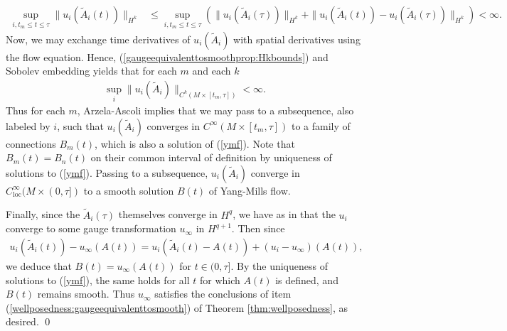 \documentclass[12pt]{amsart}
\renewcommand{\1}{{\mathbf 1}}
\theoremstyle{others}
\numberwithin{equation}{section}
\begin{document}
    \begin{align}\label{gaugeequivalenttosmoothprop:Hkbounds}
        \sup_{i, t_m \leq t \leq \tau} \|u_i(\tilde{A}_i(t))\|_{H^k} &\leq \sup_{i, t_m \leq t \leq \tau} \left(\|u_i(\tilde{A}_i(\tau))\|_{H^k} + \|u_i(\tilde{A}_i(t)) - u_i(\tilde{A}_i(\tau))\|_{H^k} \right) < \infty.
    \end{align} Now, we may exchange time derivatives of \(u_i(\tilde{A}_i)\) with spatial derivatives using the flow equation. Hence, (\ref{gaugeequivalenttosmoothprop:Hkbounds}) and Sobolev embedding yields that for each \(m\) and each \(k\)
    \begin{align*}
        \sup_i \|u_i(\tilde{A}_i)\|_{C^k(M \times [t_m, \tau])} < \infty.
    \end{align*}
    Thus for each \(m\), Arzela-Ascoli implies that we may pass to a subsequence, also labeled by \(i\), such that \(u_i(\tilde{A}_i)\) converges in \(C^\infty(M \times [t_m, \tau])\) to a family of connections \(B_m(t)\), which is also a solution of (\ref{ymf}). Note that \(B_m(t) = B_n(t)\) on their common interval of definition by uniqueness of solutions to (\ref{ymf}). Passing to a subsequence, \(u_i(\tilde{A}_i)\) converge in \(C_{\text{loc}}^\infty(M \times (0, \tau])\) to a smooth solution \(B(t)\) of Yang-Mills flow. \par
    Finally, since the \(\tilde{A}_i(\tau)\) themselves converge in \(H^q\), we have as in \cite[.17]{donkron} that the \(u_i\) converge to some gauge transformation \(u_\infty\) in \(H^{q+1}\). Then since
    \begin{align*}
        u_i(\tilde{A}_i(t)) - u_\infty(A(t)) = u_i(\tilde{A}_i(t) - A(t)) + (u_i - u_\infty)(A(t)),
    \end{align*} we deduce that \(B(t) = u_\infty(A(t))\) for \(t \in (0, \tau]\). By the uniqueness of solutions to (\ref{ymf}), the same holds for all \(t\) for which \(A(t)\) is defined, and \(B(t)\) remains smooth. Thus \(u_\infty\) satisfies the conclusions of item (\ref{wellposedness:gaugeequivalenttosmooth}) of Theorem \ref{thm:wellposedness}, as desired. \qed



\vspace{5mm}
\end{document}
